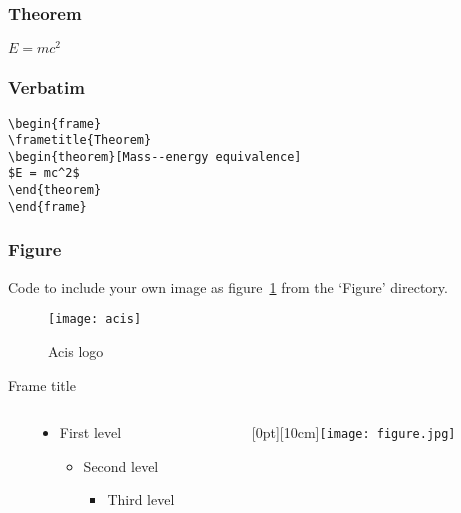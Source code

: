 
\begin{frame}
  \frametitle{Theorem}
  \begin{theorem}
    $E = mc^2$
  \end{theorem}
\end{frame}


\begin{frame}[fragile] %
  \frametitle{Verbatim}
  \begin{example}
    \begin{verbatim}
\begin{frame}
\frametitle{Theorem}
\begin{theorem}[Mass--energy equivalence]
$E = mc^2$
\end{theorem}
\end{frame}\end{verbatim}
  \end{example}
\end{frame}


\begin{frame}
  \frametitle{Figure}
  Code to include your own image as figure~\ref{fig:acis} from the `Figure' directory.
  \begin{figure}
    \texttt{[image: acis]}
    \caption{Acis logo}
    \label{fig:acis}
  \end{figure}
\end{frame}

\begin{frame}{Frame title}
  \begin{columns}[onlytextwidth]\
    \begin{column}{.5\textwidth}
      \begin{itemize}
        \item First level
              \begin{itemize}
                \item Second level
                      \begin{itemize}
                        \item Third level\cite{Weng98}
                      \end{itemize}
              \end{itemize}
      \end{itemize}
    \end{column}
    \begin{column}{.5\textwidth}
      \hfill\raisebox{-10cm}[0pt][10cm]{\texttt{[image: figure.jpg]}}
    \end{column}
  \end{columns}
\end{frame}


